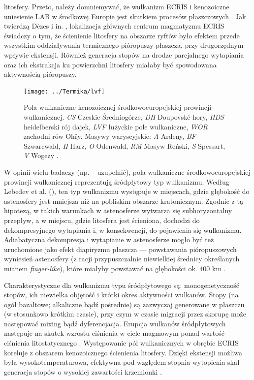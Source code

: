 \documentclass[11.5pt,twoside]{report}
\begin{document}
litosfery. Przeto, należy domniemywać, że wulkanizm ECRIS i kenozoiczne uniesienie LAB w środkowej Europie jest skutkiem procesów płaszczowych \parencite{Meier.2016}. Jak twierdzą D\`{e}zes i in. \cite{Dezes.2004}, lokalizacja głównych centrum magmatyzmu ECRIS świadczy o tym, że ścienienie litosfery na obszarze ryftów było efektem przede wszystkim oddziaływania termicznego pióropuszy płaszcza, przy drugorzędnym wpływie ekstensji. Również generacja stopów na drodze parcjalnego wytapiania oraz ich ekstrakcja ku powierzchni litosfery miałaby być spowodowana aktywnością pióropuszy.
 
 
 \begin{figure}[h]
 	\centering
 	\texttt{[image: ../Termika/lvf]}
 	\caption{Pola wulkaniczne kenozoicznej środkowoeuropejskiej prowincji wulkanicznej. \textit{CS} Czeskie Średniogórze, \textit{DH} Doupovsk\'{e} hory, \textit{HDS} heidelberski rój dajek, \textit{LVF} łużyckie pole wulkaniczne, \textit{WOR} zachodni rów Oh\v{r}y. Masywy waryscyjskie: \textit{A} Ardeny, \textit{BF} Szwarcwald, \textit{H} Harz, \textit{O} Odenwald, \textit{RM} Masyw Reński, \textit{S} Spessart, \textit{V} Wogezy \parencite{Buchner.2015}.} 
 	\label{buchner}
 \end{figure}
 
 W opinii wielu badaczy (np. \cite{Wilson.2006} -- uzupelnić), pola wulkaniczne środkowoeuropejskiej prowincji wulkanicznej reprezentują śródpłytowy typ wulkanizmu. Według Lebedev et al. (\citeyear{Lebedev.2006}), ten typ wulkanizmu występuje w miejscach, gdzie głębokość do astenosfery jest mniejsza niż na pobliskim obszarze kratonicznym. Zgodnie z tą hipotezą, w takich warunkach w astenosferze wytwarza się subhoryzontalny przepływ, a w miejscu, gdzie litosfera jest ścieniona, dochodzi do dekompresyjnego wytapiania i, w konsekwencji, do pojawienia się wulkanizmu. Adiabatyczna dekompresja i wytapianie w astenosferze mogło być też uruchomione jako efekt diapiryzmu płaszcza --- powstawania pióropuszowych wyniesień astenosfery (z racji przypuszczalnie niewielkiej średnicy określanych mianem \textit{finger-like}), które miałyby powstawać na głębokości ok. 400 km \parencite{Wilson.2006}. 
 
 Charakterystyczne dla wulkanizmu typu śródpłytowego są: monogenetyczność stopów, ich niewielka objętość i krótki okres aktywności wulkanów. Stopy (na ogół bazaltowe; alkaliczne bąd\'{z} pośrednie) są zazwyczaj generowane w płaszczu (w stosunkowo krótkim czasie), przy czym w czasie migracji przez skorupę może następować mixing bąd\'{z} dyferencjacja. Erupcja wulkanów śródpłytowych następuje na skutek wzrostu ciśnienia w ciele magmowym ponad wartość ciśnienia litostatycznego \parencite{Kereszturi.2013}. Występowanie pól wulkanicznych w obrębie ECRIS koreluje z obszarem kenozoicznego ścienienia litosfery. Dzięki ekstensji możliwa była wysokotemperaturowa, efektywna pod względem stopnia wytopienia skał generacja stopów o wysokiej zawartości krzemionki \parencite{Meier.2016}.
 
\end{document}
